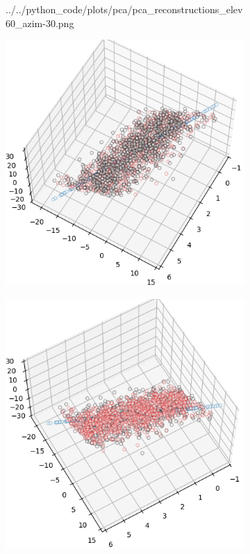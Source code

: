 \begin{figure}[htbp]
\begin{subfigure}[t]{.24\textwidth}
        {../../python_code/plots/pca/pca_reconstructions_elev60_azim-30.png}
    \end{subfigure}
    \begin{subfigure}[t]{.24\textwidth}
        \centering
        \includegraphics[width=\linewidth]
        {../../python_code/plots/pca/pca_reconstructions_elev60_azim30.png}
    \end{subfigure}
    \begin{subfigure}[t]{.24\textwidth}
        \centering
        \includegraphics[width=\linewidth]
        {../../python_code/plots/pca/pca_reconstructions_elev60_azim60.png}
    \end{subfigure}
\end{figure}
